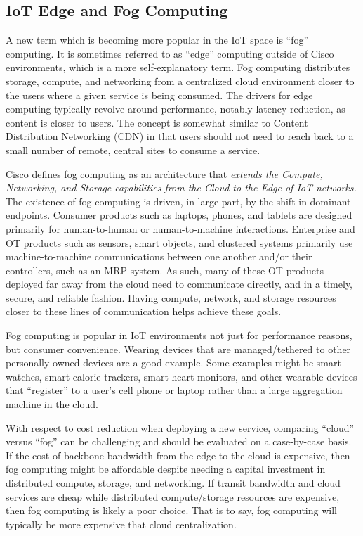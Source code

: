 \subsection{IoT Edge and Fog Computing}
A new term which is becoming more popular in the IoT space is ``fog''
computing. It is sometimes referred to as ``edge'' computing outside of Cisco
environments, which is a more self-explanatory term. Fog computing distributes
storage, compute, and networking from a centralized cloud environment closer
to the users where a given service is being consumed. The drivers for edge
computing typically revolve around performance, notably latency reduction, as
content is closer to users. The concept is somewhat similar to Content
Distribution Networking (CDN) in that users should not need to reach back to a
small number of remote, central sites to consume a service.

Cisco defines fog computing as an architecture that \textit{extends the Compute,
Networking, and Storage capabilities from the Cloud to the Edge of IoT
networks.} The existence of fog computing is driven, in large part, by the
shift in dominant endpoints. Consumer products such as laptops, phones, and
tablets are designed primarily for human-to-human or human-to-machine
interactions. Enterprise and OT products such as sensors, smart objects, and
clustered systems primarily use machine-to-machine communications between one
another and/or their controllers, such as an MRP system. As such, many of
these OT products deployed far away from the cloud need to communicate
directly, and in a timely, secure, and reliable fashion. Having compute,
network, and storage resources closer to these lines of communication helps
achieve these goals.

Fog computing is popular in IoT environments not just for performance reasons,
but consumer convenience. Wearing devices that are managed/tethered to other
personally owned devices are a good example. Some examples might be smart
watches, smart calorie trackers, smart heart monitors, and other wearable
devices that ``register'' to a user’s cell phone or laptop rather than a large
aggregation machine in the cloud.

With respect to cost reduction when deploying a new service, comparing
``cloud'' versus ``fog'' can be challenging and should be evaluated on a
case-by-case basis. If the cost of backbone bandwidth from the edge to the
cloud is expensive, then fog computing might be affordable despite needing a
capital investment in distributed compute, storage, and networking. If transit
bandwidth and cloud services are cheap while distributed compute/storage
resources are expensive, then fog computing is likely a poor choice. That is
to say, fog computing will typically be more expensive that cloud
centralization.

